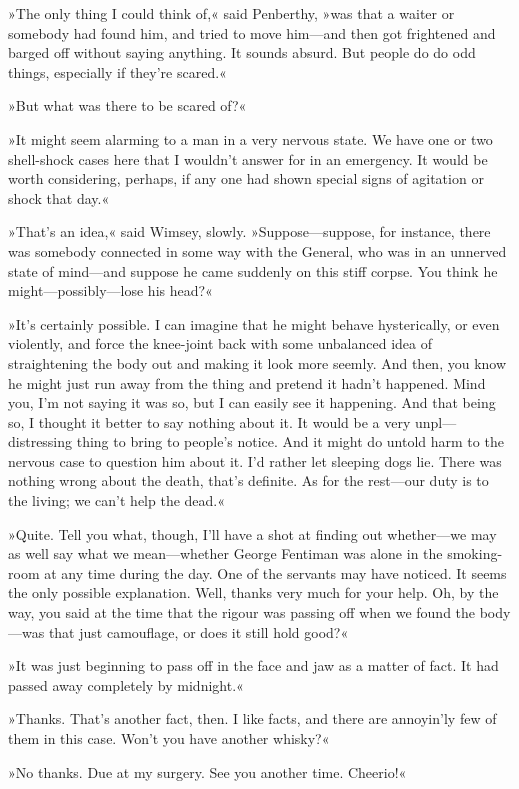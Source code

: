 »The only thing I could think of,« said Penberthy, »was that a waiter or somebody had found him, and tried to move him—and then got frightened and barged off without saying anything. It sounds absurd. But people do do odd things, especially if they're scared.«

»But what was there to be scared of?«

»It might seem alarming to a man in a very nervous state. We have one or two shell-shock cases here that I wouldn't answer for in an emergency. It would be worth considering, perhaps, if any one had shown special signs of agitation or shock that day.«

»That's an idea,« said Wimsey, slowly. »Suppose—suppose, for instance, there was somebody connected in some way with the General, who was in an unnerved state of mind—and suppose he came suddenly on this stiff corpse. You think he might—possibly—lose his head?«

»It's certainly possible. I can imagine that he might behave hysterically, or even violently, and force the knee-joint back with some unbalanced idea of straightening the body out and making it look more seemly. And then, you know he might just run away from the thing and pretend it hadn't happened. Mind you, I'm not saying it was so, but I can easily see it happening. And that being so, I thought it better to say nothing about it. It would be a very unpl—distressing thing to bring to people's notice. And it might do untold harm to the nervous case to question him about it. I'd rather let sleeping dogs lie. There was nothing wrong about the death, that's definite. As for the rest—our duty is to the living; we can't help the dead.«

»Quite. Tell you what, though, I'll have a shot at finding out whether—we may as well say what we mean—whether George Fentiman was alone in the smoking-room at any time during the day. One of the servants may have noticed. It seems the only possible explanation. Well, thanks very much for your help. Oh, by the way, you said at the time that the rigour was passing off when we found the body—was that just camouflage, or does it still hold good?«

»It was just beginning to pass off in the face and jaw as a matter of fact. It had passed away completely by midnight.«

»Thanks. That's another fact, then. I like facts, and there are annoyin'ly few of them in this case. Won't you have another whisky?«

»No thanks. Due at my surgery. See you another time. Cheerio!«

